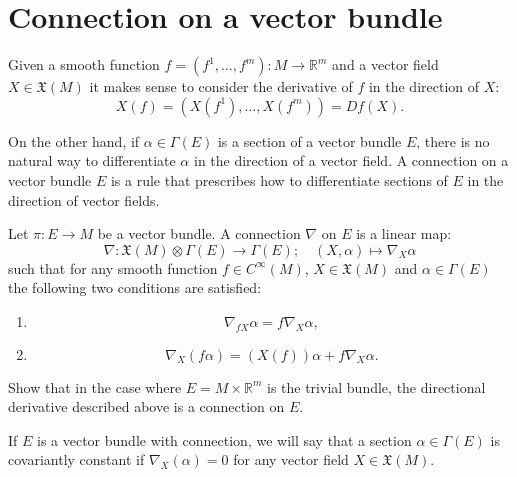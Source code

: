 \section{Connection on a vector bundle}


Given a smooth function $f=(f^{1},\dots,f^{m}):M\rightarrow\mathbb{R}^{m}$ and
a vector field $X\in\mathfrak{X}(M)$ it makes sense to consider the derivative
of $f$ in the direction of $X$:
\[
X(f)=(X(f^{1}),\dots,X(f^{m}))=Df (X).
\]


On the other hand, if $\alpha\in\Gamma(E)$ is a section of a vector bundle
$E$, there is no natural way to differentiate $\alpha$ in the direction of a
vector field. A connection on a vector bundle $E$ is a rule that prescribes
how to differentiate sections of $E$ in the direction of vector fields.

\begin{definition}
	Let $\pi:E\rightarrow M$ be a vector bundle. A connection $\nabla$ on $E$ is a
	linear map:
	\[
	\nabla:\mathfrak{X}(M)\otimes\Gamma(E)\rightarrow\Gamma(E);\quad
	(X,\alpha)\mapsto\nabla_{X}\alpha
	\]
	such that for any smooth function $f\in C^{\infty}(M)$, $X\in\mathfrak{X}(M)$
	and $\alpha\in\Gamma(E)$ the following two conditions are satisfied:
	\begin{enumerate}
		\item \[\nabla_{fX}\alpha=f\nabla_{X}\alpha,\]
		\item \[\nabla_{X}\left(  f\alpha\right)  =\left(  X(f)\right)  \alpha
		+f\nabla_{X}\alpha.\]
	\end{enumerate}
\end{definition}

\begin{exercise}
	Show that in the case where $E=M \times\mathbb{R}^{m}$ is the trivial bundle,
	the directional derivative described above is a connection on $E$.
\end{exercise}

\begin{definition}
	If $E$ is a vector bundle with connection, we will say that a section
	$\alpha\in\Gamma(E)$ is covariantly constant if $\nabla_{X}(\alpha)=0$ for any
	vector field $X\in\mathfrak{X}(M)$.
\end{definition}

